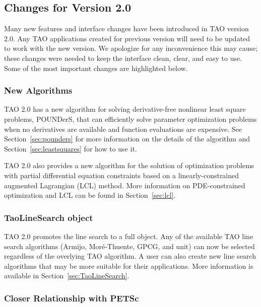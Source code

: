\subsection*{Changes for Version 2.0}

Many new features and interface changes have been introduced in TAO version 2.0.
Any TAO applications created for previous version will need to be updated to 
work with the new version.  We apologize for any inconvenience this may
cause; these changes were needed to keep the interface
clean, 
clear, and easy to use. Some of the most important changes are highlighted 
below.

\subsubsection*{New Algorithms}

TAO 2.0 has a new algorithm for solving derivative-free nonlinear least
square 
problems, POUNDerS, that can efficiently solve parameter optimization problems 
when no derivatives are available and function evaluations are expensive. 
See 
Section~\ref{sec:pounders} for more information on the details of the 
algorithm and Section~\ref{sec:leastsquares} for how to use it.

TAO 2.0 also provides a new algorithm for the solution of optimization
problems with partial differential equation constraints based on a
linearly-constrained augmented Lagrangian (LCL) method.  More 
information on PDE-constrained optimization and LCL can be found 
in Section~\ref{sec:lcl}.

\subsubsection*{TaoLineSearch object}

TAO 2.0 promotes the line search to a full object.  Any of the available 
TAO line search algorithms (Armijo, Mor\'e-Thuente, GPCG, and unit) can now 
be selected regardless of the overlying TAO algorithm.  A user can also
create new line search algorithms that may be more suitable for their
applications.  More information is available in 
Section~\ref{sec:TaoLineSearch}.

\subsubsection*{Closer Relationship with PETSc}

